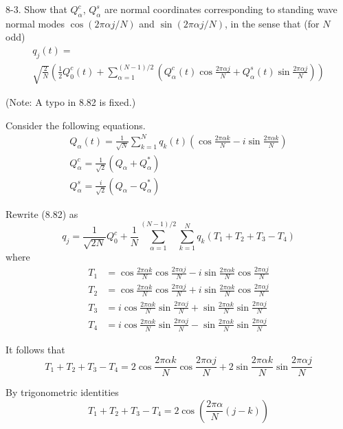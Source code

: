\documentclass[12pt]{article}
\begin{document}
8-3.
Show that $Q_\alpha^c$, $Q_\alpha^s$ are normal coordinates
corresponding to standing wave normal modes
$\cos(2\pi\alpha j/N)$ and $\sin(2\pi\alpha j/N)$,
in the sense that (for $N$ odd)
\begin{multline*}
q_j(t)=
\\
\sqrt{\frac{2}{N}}\left(
\frac{1}{2}Q_0^c(t)
+\sum_{\alpha=1}^{(N-1)/2}
\left(
Q_\alpha^c(t)\cos\frac{2\pi\alpha j}{N}
+Q_\alpha^s(t)\sin\frac{2\pi\alpha j}{N}
\right)
\right)
\tag{8.82}
\end{multline*}

(Note: A typo in 8.82 is fixed.)

\bigskip
Consider the following equations.
\begin{gather*}
Q_\alpha(t)=\frac{1}{\sqrt N}\sum_{k=1}^Nq_k(t)
\left(
\cos\frac{2\pi\alpha k}{N}-i\sin\frac{2\pi\alpha k}{N}
\right)
\tag{8.77}
\\
Q_\alpha^c=\frac{1}{\sqrt2}(Q_\alpha+Q_\alpha^*)
\tag{8.79}
\\
Q_\alpha^s=\frac{i}{\sqrt2}(Q_\alpha-Q_\alpha^*)
\tag{8.80}
\end{gather*}

Rewrite (8.82) as
\begin{equation*}
q_j=
\frac{1}{\sqrt{2N}}Q_0^c
+
\frac{1}{N}
\sum_{\alpha=1}^{(N-1)/2}
\sum_{k=1}^N
q_k(T_1+T_2+T_3-T_4)
\tag{1}
\end{equation*}
where
\begin{align*}
T_1&=\cos\frac{2\pi\alpha k}{N}\cos\frac{2\pi\alpha j}{N}
-i\sin\frac{2\pi\alpha k}{N}\cos\frac{2\pi\alpha j}{N}
\\
T_2&=\cos\frac{2\pi\alpha k}{N}\cos\frac{2\pi\alpha j}{N}
+i\sin\frac{2\pi\alpha k}{N}\cos\frac{2\pi\alpha j}{N}
\\
T_3&=i\cos\frac{2\pi\alpha k}{N}\sin\frac{2\pi\alpha j}{N}
+\sin\frac{2\pi\alpha k}{N}\sin\frac{2\pi\alpha j}{N}
\\
T_4&=i\cos\frac{2\pi\alpha k}{N}\sin\frac{2\pi\alpha j}{N}
-\sin\frac{2\pi\alpha k}{N}\sin\frac{2\pi\alpha j}{N}
\end{align*}

It follows that
\begin{equation*}
T_1+T_2+T_3-T_4=
2\cos\frac{2\pi\alpha k}{N}\cos\frac{2\pi\alpha j}{N}
+2\sin\frac{2\pi\alpha k}{N}\sin\frac{2\pi\alpha j}{N}
\end{equation*}

By trigonometric identities
\begin{equation*}
T_1+T_2+T_3-T_4=2\cos\left(\frac{2\pi\alpha}{N}(j-k)\right)
\tag{2}
\end{equation*}
\end{document}
